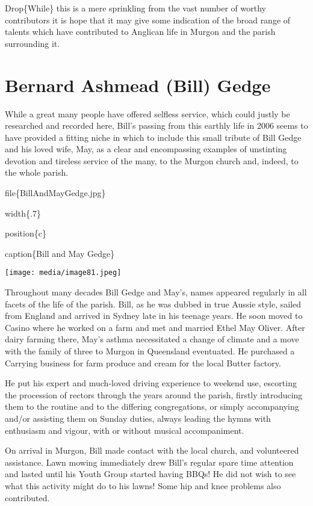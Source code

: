 Drop\{While\} this is a mere sprinkling from the vast number of worthy contributors it is hope that it may give some indication of the broad range of talents which have contributed to Anglican life in Murgon and the parish surrounding it.

\hypertarget{bernard-ashmead-bill-gedge}{%
\section{Bernard Ashmead (Bill) Gedge}\label{bernard-ashmead-bill-gedge}}

While a great many people have offered selfless service, which could justly be researched and recorded here, Bill's passing from this earthly life in 2006 seems to have provided a fitting niche in which to include this small tribute of Bill Gedge and his loved wife, May, as a clear and encompassing examples of unstinting devotion and tireless service of the many, to the Murgon church and, indeed, to the whole parish.

file\{BillAndMayGedge.jpg\}

width\{.7\}

position\{c\}

caption\{Bill and May Gedge\}

\texttt{[image: media/image81.jpeg]}

Throughout many decades Bill Gedge and May's, names appeared regularly in all facets of the life of the parish. Bill, as he was dubbed in true Aussie style, sailed from England and arrived in Sydney late in his teenage years. He soon moved to Casino where he worked on a farm and met and married Ethel May Oliver. After dairy farming there, May's asthma necessitated a change of climate and a move with the family of three to Murgon in Queensland eventuated. He purchased a Carrying business for farm produce and cream for the local Butter factory.

He put his expert and much-loved driving experience to weekend use, escorting the procession of rectors through the years around the parish, firstly introducing them to the routine and to the differing congregations, or simply accompanying and/or assisting them on Sunday duties, always leading the hymns with enthusiasm and vigour, with or without musical accompaniment.

On arrival in Murgon, Bill made contact with the local church, and volunteered assistance. Lawn mowing immediately drew Bill's regular spare time attention and lasted until his Youth Group started having BBQs! He did not wish to see what this activity might do to his lawns! Some hip and knee problems also contributed.


